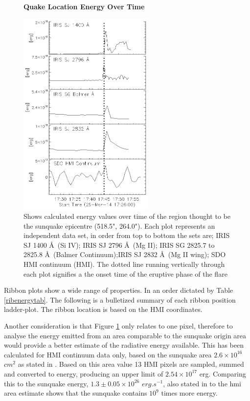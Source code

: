 \begin{figure}[H]
  \begin{center}
  \textbf{Quake Location Energy Over Time}\par\medskip
  \includegraphics[width=0.6\textwidth]{29-Mar-14-Quake-Energy-Ladder}
  \end{center}
  \caption{Shows calculated energy values over time of the region thought to be the sunquake epicentre (518.5", 264.0"). Each plot represents an independent data set, in order from top to bottom the sets are; IRIS SJ 1400 \AA\ (Si IV); IRIS SJ 2796 \AA\ (Mg II); IRIS SG  2825.7 to 2825.8 \AA\ (Balmer Continuum);IRIS SJ 2832 \AA\ (Mg II wing); SDO HMI continuum (HMI). The dotted line running vertically through each plot signifies a the onset time of the eruptive phase of the flare}\label{eqk}
\end{figure}

Ribbon plots show a wide range of properties. In an order dictated by Table \ref{ribenergytab}. The following is a bulletized summary of each ribbon position ladder-plot. The ribbon location is based on the HMI coordinates.


Another consideration is that Figure \ref{eqk} only relates to one pixel, therefore to analyse the energy emitted from an area comparable to the sunquake origin area would provide a better estimate of the radiative energy available. This has been calculated for HMI continuum data only, based on the sunquake area $2.6{\times}10^{16}$ $cm^{2}$ as stated in \cite{2014ApJ...796...85J}. Based on this area value 13 HMI pixels are sampled, summed and converted to energy, producing an upper limit of $2.54{\times}10^{17}$ erg. Comparing this to the sunquake energy, $1.3\pm0.05{\times}10^{26}$ $erg.s^{-1}$, also stated in \cite{2014ApJ...796...85J} to the hmi area estimate shows that the sunquake contains $10^{9}$ times more energy. 





